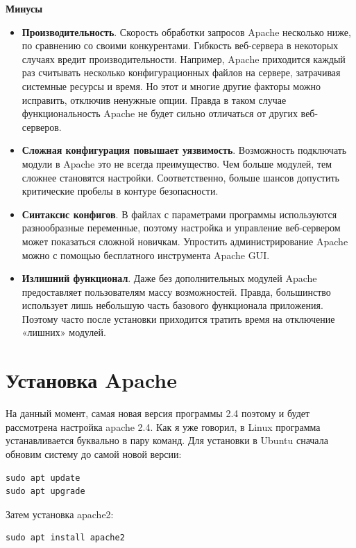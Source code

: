 \documentclass[14pt, a4paper]{article}
\begin{document}
\textbf{Минусы}
\begin{itemize}
    \item \textbf{Производительность}. Скорость обработки запросов Apache несколько ниже, по 
    сравнению со своими конкурентами. Гибкость веб-сервера в некоторых случаях вредит 
    производительности. Например, Apache приходится каждый раз считывать несколько 
    конфигурационных файлов на сервере, затрачивая системные ресурсы и время. Но этот 
    и многие другие факторы можно исправить, отключив ненужные опции. Правда в таком 
    случае функциональность Apache не будет сильно отличаться от других веб-серверов.
    \item \textbf{Сложная конфигурация повышает уязвимость}. Возможность подключать модули в 
    Apache это не всегда преимущество. Чем больше модулей, тем сложнее становятся настройки. 
    Соответственно, больше шансов допустить критические пробелы в контуре безопасности.
    \item \textbf{Синтаксис конфигов}. В файлах с параметрами программы используются разнообразные 
    переменные, поэтому настройка и управление веб-сервером может показаться сложной новичкам. 
    Упростить администрирование Apache можно с помощью бесплатного инструмента Apache GUI.
    \item \textbf{Излишний функционал}. Даже без дополнительных модулей Apache предоставляет 
    пользователям массу возможностей. Правда, большинство использует лишь небольшую часть 
    базового функционала приложения. Поэтому часто после установки приходится тратить время 
    на отключение «лишних» модулей.
\end{itemize}



\section*{Установка Apache}
На данный момент, самая новая версия программы 2.4 поэтому и будет рассмотрена настройка apache 2.4. 
Как я уже говорил, в Linux программа устанавливается буквально в пару команд. Для установки в 
Ubuntu сначала обновим систему до самой новой версии:

\begin{lstlisting}
sudo apt update
sudo apt upgrade
\end{lstlisting}

Затем установка apache2:
\begin{lstlisting}
sudo apt install apache2
\end{lstlisting}
\end{document}
